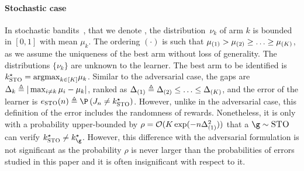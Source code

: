 \paragraph{Stochastic case}
 In stochastic bandits~\citep{Audibert10BA}, that
  we denote \stoPro{}, the distribution~$\nu_{k}$ of arm $k$ is bounded in $[0,1]$ with mean $\mu_{k}$. %
 The ordering $(\cdot)$ is such that $\mu_{(1)}>\mu_{(2)}
 \geq\ldots\geq\mu_{(K)}$, as we assume  the uniqueness of the best arm without loss 
 of generality.
 The distributions $\{\nu_{k}\}$ are unknown to the learner.
 The best arm to be identified is  $k^\star_{\textsc{STO}}= \mathrm{argmax}_{k\in[K]} \mu_k$.
 Similar to the adversarial case, the gaps are 
 $\Delta_{k} \triangleq |\max_{i \neq k} \mu_{i} - \mu_{k}|$, ranked as
$\Delta_{(1)} \triangleq \Delta_{(2)}\leq\ldots\leq\Delta_{(K)}$, 
 and the error 
 of the learner is $\ProErr_{\stoPro}(\timeHorizon) 
 \triangleq \Pro\left(\recomArm_n \neq \bestArmSto\right)$.  
 However, unlike in the adversarial case, this definition of the 
 error includes the randomness of rewards.
 Nonetheless, it is only with a probability upper-bounded 
 by $\rho=\mathcal{O}(K\exp(-n\Delta^2_{(1)}))$
   that a $\gainVector\sim\stoPro$ can verify 
   $\bestArmSto\neq\bestArm_\gainVector$. However, this difference 
   with the adversarial formulation is not significant as the 
   probability $\rho$ is never larger than the probabilities of errors studied in this paper 
   and it is often insignificant with 
   respect to it.
 
